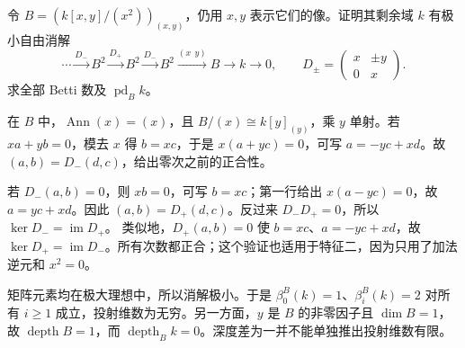 \begin{exercise}\label{g5:ex:double-line-residue-resolution}
	令 \(B=(k[x,y]/(x^2))_{(x,y)}\)，仍用 \(x,y\) 表示它们的像。证明其剩余域 \(k\) 有极小自由消解
	\[
		\cdots\xrightarrow{D_-}B^2\xrightarrow{D_+}B^2
		\xrightarrow{D_-}B^2\xrightarrow{(x\ \ y)}B
		\longrightarrow k\longrightarrow0,
		\qquad
		D_\pm=\begin{pmatrix}x&\pm y\\0&x\end{pmatrix}.
	\]
	求全部 Betti 数及 \(\operatorname{pd}_B k\)。
\end{exercise}
\begin{solution}
	在 \(B\) 中，\(\operatorname{Ann}(x)=(x)\)，且 \(B/(x)\cong k[y]_{(y)}\)，乘 \(y\) 单射。若 \(xa+yb=0\)，模去 \(x\) 得 \(b=xc\)，于是 \(x(a+yc)=0\)，可写 \(a=-yc+xd\)。故
	\((a,b)=D_-(d,c)\)，给出零次之前的正合性。

	若 \(D_-(a,b)=0\)，则 \(xb=0\)，可写 \(b=xc\)；第一行给出 \(x(a-yc)=0\)，故 \(a=yc+xd\)。因此 \((a,b)=D_+(d,c)\)。反过来 \(D_-D_+=0\)，所以 \(\ker D_-=\operatorname{im}D_+\)。
	类似地，\(D_+(a,b)=0\) 使 \(b=xc\)、\(a=-yc+xd\)，故 \(\ker D_+=\operatorname{im}D_-\)。所有次数都正合；这个验证也适用于特征二，因为只用了加法逆元和 \(x^2=0\)。

	矩阵元素均在极大理想中，所以消解极小。于是
	\(\beta_0^B(k)=1\)、\(\beta_i^B(k)=2\) 对所有 \(i\geq1\) 成立，投射维数为无穷。另一方面，\(y\) 是 \(B\) 的非零因子且 \(\dim B=1\)，故 \(\operatorname{depth}B=1\)，而 \(\operatorname{depth}_B k=0\)。深度差为一并不能单独推出投射维数有限。
\end{solution}
